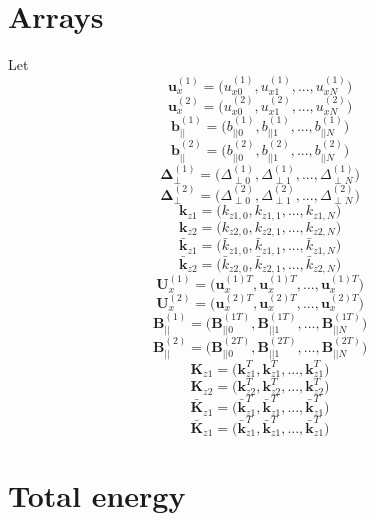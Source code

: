 \documentclass{article}
\let\vec\boldsymbol
\begin{document}
\section*{Arrays}
Let
\[\vec{u}_x^{(1)}=\Big( u_{x0}^{(1)}, u_{x1}^{(1)}, ..., u_{xN}^{(1)} \Big)\]
\[\vec{u}_x^{(2)}=\Big( u_{x0}^{(2)}, u_{x1}^{(2)}, ..., u_{xN}^{(2)} \Big)\]
\[\vec{b}_{||}^{(1)}=\Big( b_{||0}^{(1)}, b_{||1}^{(1)}, ..., b_{||N}^{(1)} \Big)\]
\[\vec{b}_{||}^{(2)}=\Big( b_{||0}^{(2)}, b_{||1}^{(2)}, ..., b_{||N}^{(2)} \Big)\]
\[\vec{\Delta}_\perp^{(1)}=\Big( \Delta_{\perp 0}^{(1)}, \Delta_{\perp 1}^{(1)}, ..., \Delta_{\perp N}^{(1)} \Big)\]
\[\vec{\Delta}_\perp^{(2)}=\Big( \Delta_{\perp 0}^{(2)}, \Delta_{\perp 1}^{(2)}, ..., \Delta_{\perp N}^{(2)} \Big)\]
\[\vec{k}_{z1} = \Big( k_{z1,0}, k_{z1,1}, ..., k_{z1,N} \Big)\]
\[\vec{k}_{z2} = \Big( k_{z2,0}, k_{z2,1}, ..., k_{z2,N} \Big)\]
\[\vec{\bar{k}}_{z1} = \Big( \bar{k}_{z1,0}, \bar{k}_{z1,1}, ..., \bar{k}_{z1,N} \Big)\]
\[\vec{\bar{k}}_{z2} = \Big( \bar{k}_{z2,0}, \bar{k}_{z2,1}, ..., \bar{k}_{z2,N} \Big)\]
\[\vec{U}_x^{(1)}=\Big( \vec{u}_x^{(1)T}, \vec{u}_x^{(1)T}, ..., \vec{u}_x^{(1)T} \Big)\]
\[\vec{U}_x^{(2)}=\Big( \vec{u}_x^{(2)T}, \vec{u}_x^{(2)T}, ..., \vec{u}_x^{(2)T} \Big)\]
\[\vec{B}_{||}^{(1)}=\Big( \vec{B}_{||0}^{(1T)}, \vec{B}_{||1}^{(1T)}, ..., \vec{B}_{||N}^{(1T)} \Big)\]
\[\vec{B}_{||}^{(2)}=\Big( \vec{B}_{||0}^{(2T)}, \vec{B}_{||1}^{(2T)}, ..., \vec{B}_{||N}^{(2T)} \Big)\]
\[\vec{K}_{z1} = \Big( \vec{k}_{z1}^T, \vec{k}_{z1}^T, ..., \vec{k}_{z1}^T \Big)\]
\[\vec{K}_{z2} = \Big( \vec{k}_{z2}^T, \vec{k}_{z2}^T, ..., \vec{k}_{z2}^T \Big)\]
\[\vec{\bar{K}}_{z1} = \Big( \vec{\bar{k}}_{z1}^T, \vec{\bar{k}}_{z1}^T, ..., \vec{\bar{k}}_{z1}^T \Big)\]
\[\vec{\bar{K}}_{z1} = \Big( \vec{\bar{k}}_{z1}^T, \vec{\bar{k}}_{z1}^T, ..., \vec{\bar{k}}_{z1}^T \Big)\]

\section*{Total energy}
\end{document}
